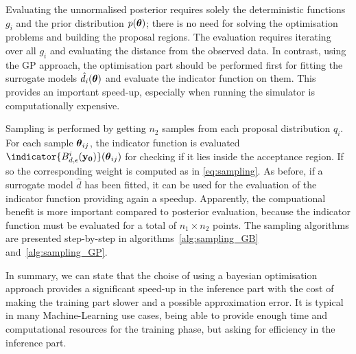 \noindent
Evaluating the unnormalised posterior requires solely the
deterministic functions $g_i$ and the prior distribution $p(\boldsymbol{\theta})$;
there is no need for solving the optimisation problems and building
the proposal regions. The evaluation requires iterating over all $g_i$
and evaluating the distance from the observed data. In contrast, using
the GP approach, the optimisation part should be performed first for
fitting the surrogate models $\hat{d}_i(\boldsymbol{\theta})$ and evaluate the
indicator function on them. This provides an important speed-up,
especially when running the simulator is computationally
expensive. %

\noindent
Sampling is performed by getting $n_2$ samples from each proposal
distribution $q_i$. For each sample $\boldsymbol{\theta}_{ij}$, the indicator function
is evaluated $\indicator{\regioni(\data)}(\thetab_{ij})$ for checking
if it lies inside the acceptance region. If so the corresponding
weight is computed as in \eqref{eq:sampling}. As before, if a surrogate
model $\hat{d}$ has been fitted, it can be used for the evaluation of
the indicator function providing again a speedup. Apparently, the
compuational benefit is more important compared to posterior
evaluation, because the indicator function must be evaluated for a
total of $n_1 \times n_2$ points. The sampling algorithms are
presented step-by-step in algorithms~\ref{alg:sampling_GB}
and~\ref{alg:sampling_GP}.

\noindent
In summary, we can state that the choise of using a bayesian
optimisation approach provides a significant speed-up in the inference
part with the cost of making the training part slower and a possible
approximation error. It is typical in many Machine-Learning use cases,
being able to provide enough time and computational resources for the
training phase, but asking for efficiency in the inference
part.

